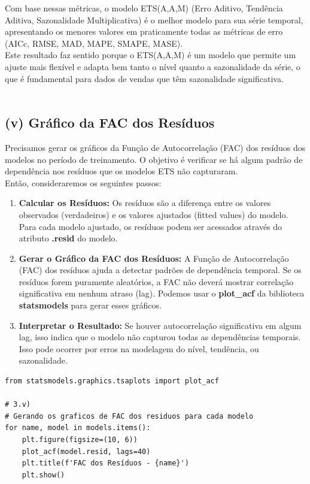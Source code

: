 \documentclass[a4paper, 12pt]{article}
\begin{document}
Com base nessas métricas, o modelo ETS(A,A,M) (Erro Aditivo, Tendência Aditiva, Sazonalidade Multiplicativa) é o melhor modelo para sua série temporal, apresentando os menores valores em praticamente todas as métricas de erro (AICc, RMSE, MAD, MAPE, SMAPE, MASE).\\

Este resultado faz sentido porque o ETS(A,A,M) é um modelo que permite um ajuste mais flexível e adapta bem tanto o nível quanto a sazonalidade da série, o que é fundamental para dados de vendas que têm sazonalidade significativa.\\\\



\subsection{(v) Gráfico da FAC dos Resíduos}

Precisamos gerar os gráficos da Função de Autocorrelação (FAC) dos resíduos dos modelos no período de treinamento. O objetivo é verificar se há algum padrão de dependência nos resíduos que os modelos ETS não capturaram.\\

Então, consideraremos os seguintes passos:

\begin{enumerate}
    \item \textbf{Calcular os Resíduos:} Os resíduos são a diferença entre os valores observados (verdadeiros) e os valores ajustados (fitted values) do modelo. Para cada modelo ajustado, os resíduos podem ser acessados através do atributo \textbf{.resid} do modelo.
    \item \textbf{Gerar o Gráfico da FAC dos Resíduos:} A Função de Autocorrelação (FAC) dos resíduos ajuda a detectar padrões de dependência temporal. Se os resíduos forem puramente aleatórios, a FAC não deverá mostrar correlação significativa em nenhum atraso (lag). Podemos usar o \textbf{plot\_acf} da biblioteca \textbf{statsmodels} para gerar esses gráficos.
    \item \textbf{Interpretar o Resultado:} Se houver autocorrelação significativa em algum lag, isso indica que o modelo não capturou todas as dependências temporais. Isso pode ocorrer por erros na modelagem do nível, tendência, ou sazonalidade.
\end{enumerate}

\begin{lstlisting}[style=python]
from statsmodels.graphics.tsaplots import plot_acf

# 3.v)
# Gerando os graficos de FAC dos residuos para cada modelo
for name, model in models.items():
    plt.figure(figsize=(10, 6))
    plot_acf(model.resid, lags=40)
    plt.title(f'FAC dos Resíduos - {name}')
    plt.show()
    \end{lstlisting} \\
\end{document}
